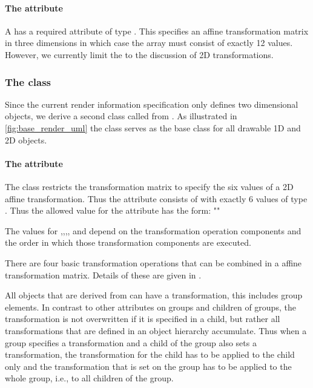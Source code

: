 \paragraph{The \fixttspace{} attribute}

A \Transformation has a required attribute  of type \doubleArray. This specifies an affine transformation matrix in three dimensions in which case the array must consist of exactly 12 values. However, we currently limit the \RenderPackage to the discussion of 2D transformations.

\subsubsection{The  class}
\label{transformationtwod-class}

Since the current render information specification only defines two dimensional objects, we derive a second class called \TransformationTwoD from \Transformation. As illustrated in \ref{fig:base_render_uml} the class \TransformationTwoD serves as the base class for all drawable 1D and 2D objects.

\paragraph{The \fixttspace{} attribute}

The \TransformationTwoD class restricts the transformation matrix to specify the six values of a 2D affine transformation. Thus the  attribute consists of \doubleArray with exactly 6 values of type . Thus the allowed 
value for the attribute has the form: ""

The values for ,,,, and  depend on the transformation operation components and the order in which those transformation components are executed.

There are four basic transformation operations that can be combined in a affine transformation matrix.  Details of these are given in .

All objects that are derived from \TransformationTwoD can have a transformation, this includes group elements. In contrast to other attributes on groups and children of groups, the transformation is not overwritten if it is specified in a child, but rather all transformations that are defined in an object hierarchy accumulate. Thus when a group specifies a transformation and a child of the group also sets a transformation, the transformation for the child has to be applied to the child only and the transformation that is set on the group has to be applied to the whole group, i.e., to all children of the group.

